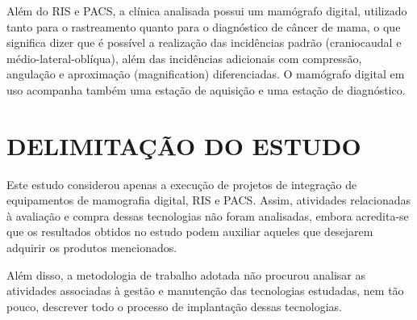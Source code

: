 Além do RIS e PACS, a clínica analisada possui um mamógrafo digital, utilizado tanto
para o rastreamento quanto para o diagnóstico de câncer de mama, o que significa dizer
que é possível a realização das incidências padrão (craniocaudal e médio-lateral-oblíqua),
além das incidências adicionais com compressão, angulação e aproximação (magnification) 
diferenciadas. O mamógrafo digital em uso acompanha também uma estação de aquisição e uma estação de diagnóstico.

\section[DELIMITAÇÃO DO ESTUDO]{DELIMITAÇÃO DO ESTUDO}
Este estudo considerou apenas a execução de projetos de integração de equipamentos de
mamografia digital, RIS e PACS. Assim, atividades relacionadas à avaliação e compra
dessas tecnologias não foram analisadas, embora acredita-se que os resultados obtidos no
estudo podem auxiliar aqueles que desejarem adquirir os produtos mencionados.

Além disso, a metodologia de trabalho adotada não procurou analisar as atividades
associadas à gestão e manutenção das tecnologias estudadas, nem tão pouco, descrever
todo o processo de implantação dessas tecnologias.